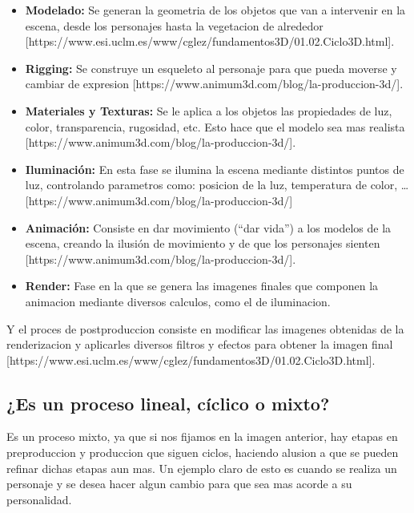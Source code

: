 \documentclass{article}
\begin{document}
\begin{itemize}
    \item \textbf{Modelado: }Se generan la geometria de los objetos que van a intervenir en la escena, desde los personajes hasta la vegetacion de alrededor [https://www.esi.uclm.es/www/cglez/fundamentos3D/01.02.Ciclo3D.html].
    \item \textbf{Rigging: }Se construye un esqueleto al personaje para que pueda moverse y cambiar de expresion [https://www.animum3d.com/blog/la-produccion-3d/].
    \item \textbf{Materiales y Texturas: }Se le aplica a los objetos las propiedades de luz, color, transparencia, rugosidad, etc. Esto hace que el modelo sea mas realista [https://www.animum3d.com/blog/la-produccion-3d/].
    \item \textbf{Iluminación: }En esta fase se ilumina la escena mediante distintos puntos de luz, controlando parametros como: posicion de la luz, temperatura de color, \dots [https://www.animum3d.com/blog/la-produccion-3d/]
    \item \textbf{Animación: }Consiste en dar movimiento (``dar vida'') a los modelos de la escena, creando la ilusión de movimiento y de que los personajes sienten [https://www.animum3d.com/blog/la-produccion-3d/].
    \item \textbf{Render: }Fase en la que se genera las imagenes finales que componen la animacion mediante diversos calculos, como el de iluminacion.
\end{itemize}

Y el proces de postproduccion consiste en modificar las imagenes obtenidas de la renderizacion y aplicarles diversos filtros y efectos para obtener la imagen final [https://www.esi.uclm.es/www/cglez/fundamentos3D/01.02.Ciclo3D.html].

\subsection{¿Es un proceso lineal, cíclico o mixto?}
Es un proceso mixto, ya que si nos fijamos en la imagen anterior, hay etapas en preproduccion y produccion que siguen ciclos, haciendo alusion a que se pueden refinar dichas etapas aun mas. Un ejemplo claro de esto es cuando se realiza un personaje y se desea hacer algun cambio para que sea mas acorde a su personalidad.
\end{document}

